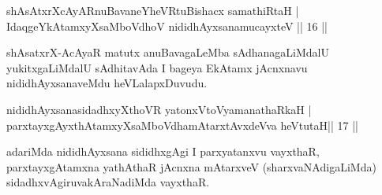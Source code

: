 
\begin{shl}
shAsAtxrXcAyARnuBavaneYheVRtuBishacx samathiRtaH |\\
IdaqgeYkAtamxyXsaMboVdhoV nididhAyxsanamucayxteV \hfill || 16 ||
\end{shl}

\begin{artha}
shAsatxrX-AcAyaR matutx anuBavagaLeMba sAdhanagaLiMdalU yukitxgaLiMdalU sAdhitavAda I bageya EkAtamx jAcnxnavu nididhAyxsanaveMdu heVLalapxDuvudu.
\end{artha}

\begin{shl}
nididhAyxsanasidadhxyXthoVR yatonxV\s toV\s yamanathaRkaH |\\
parxtayxgAyxthAtamxyXsaMboVdhamAtarxtAvxdeVva heVtutaH\hfill || 17 ||
\end{shl}

\begin{artha}
adariMda nididhAyxsana sididhxgAgi I parxyatanxvu vayxthaR, parxtayxgAtamxna yathAthaR jAcnxna mAtarxveV (sharxvaNAdigaLiMda) sidadhxvAgiruvakAraNadiMda vayxthaR.
\end{artha}

